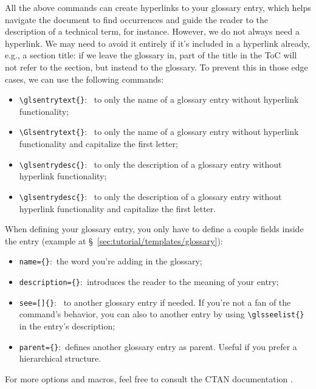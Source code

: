 All the above \glspl{command} can create \glspl{hyperlink} to your glossary entry, which helps navigate the document to find occurrences and guide the reader to the description of a technical term, for instance. However, we do not always need a \gls{hyperlink}. We may need to avoid it entirely if it's included in a \gls{hyperlink} already, e.g., a section title: if we leave the glossary  in, part of the title in the \gls{ToC} will not refer to the section, but instead to the glossary. To prevent this in those edge cases, we can use the following \glspl{command}:
\begin{itemize}
    \item \texttt{\textbackslash{}glsentrytext\{\}}:~ to only the name of a glossary entry without \gls{hyperlink} functionality;
    \item \texttt{\textbackslash{}Glsentrytext\{\}}:~ to only the name of a glossary entry without \gls{hyperlink} functionality and capitalize the first letter;
    \item \texttt{\textbackslash{}glsentrydesc\{\}}:~ to only the description of a glossary entry without \gls{hyperlink} functionality;
    \item \texttt{\textbackslash{}glsentrydesc\{\}}:~ to only the description of a glossary entry without \gls{hyperlink} functionality and capitalize the first letter.
\end{itemize}

When defining your glossary entry, you only have to define a couple fields inside the entry (example at \S~\ref{sec:tutorial/templates/glossary}):
\begin{itemize}
    \item \texttt{name=\{\}}:~the word you're adding in the glossary;
    \item \texttt{description=\{\}}:~introduces the reader to the meaning of your entry;
    \item \texttt{see=[]\{\}}:~ to another glossary entry if needed. If you're not a fan of the \gls{command}'s behavior, you can also  to another entry by using \texttt{\textbackslash{}glsseelist\{\}} in the entry's description;
    \item \texttt{parent=\{\}}:~defines another glossary entry as parent. Useful if you prefer a hierarchical structure.
\end{itemize}

\noindent For more options and \glspl{macro}, feel free to consult the \gls{CTAN} documentation \parencite{web:ctan-glossaries}.